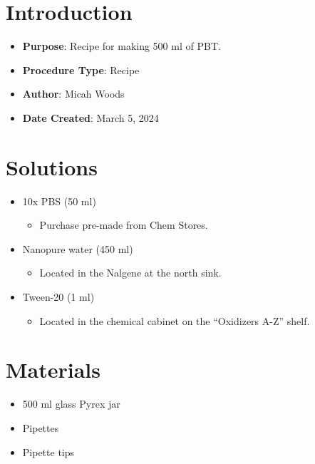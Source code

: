 \documentclass[
  letterpaper,
  DIV=11,
  numbers=noendperiod]{scrreprt}
\providecommand{\tightlist}{%
  \setlength{\itemsep}{0pt}\setlength{\parskip}{0pt}}\usepackage{longtable,booktabs,array}
\begin{document}
\hypertarget{introduction-108}{%
\section{Introduction}\label{introduction-108}}

\begin{itemize}
\tightlist
\item
  \textbf{Purpose}: Recipe for making 500 ml of PBT.
\item
  \textbf{Procedure Type}: Recipe
\item
  \textbf{Author}: Micah Woods
\item
  \textbf{Date Created}: March 5, 2024
\end{itemize}

\hypertarget{solutions-94}{%
\section{Solutions}\label{solutions-94}}

\begin{itemize}
\tightlist
\item
  10x PBS (50 ml)

  \begin{itemize}
  \tightlist
  \item
    Purchase pre-made from Chem Stores.
  \end{itemize}
\item
  Nanopure water (450 ml)

  \begin{itemize}
  \tightlist
  \item
    Located in the Nalgene at the north sink.
  \end{itemize}
\item
  Tween-20 (1 ml)

  \begin{itemize}
  \tightlist
  \item
    Located in the chemical cabinet on the ``Oxidizers A-Z'' shelf.
  \end{itemize}
\end{itemize}

\hypertarget{materials-103}{%
\section{Materials}\label{materials-103}}

\begin{itemize}
\tightlist
\item
  500 ml glass Pyrex jar
\item
  Pipettes
\item
  Pipette tips
\end{itemize}
\end{document}
